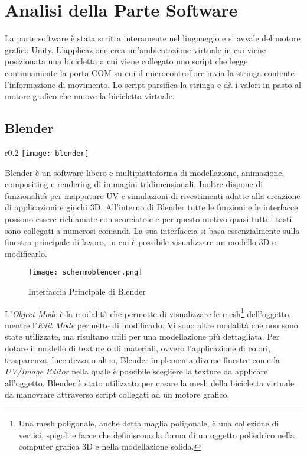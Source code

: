 \section{Analisi della Parte Software}
\label{software}
La parte software è stata scritta interamente nel linguaggio \Csharp\: e si avvale del motore grafico Unity. L'applicazione crea un'ambientazione virtuale in cui viene posizionata una bicicletta a cui viene collegato uno script che legge continuamente la porta COM su cui il microcontrollore invia la stringa contente l'informazione di movimento. Lo script parsifica la stringa e dà i valori in pasto al motore grafico che muove la bicicletta virtuale.
\subsection{Blender}
\begin{wrapfigure}{r}{0.2\textwidth} %
    \centering
    \vspace{-1.0cm}
    \texttt{[image: blender]}
\end{wrapfigure}
Blender è un software libero e multipiattaforma di modellazione, animazione, compositing e rendering di immagini tridimensionali. Inoltre dispone di funzionalità per mappature UV e simulazioni di rivestimenti adatte alla creazione di applicazioni e giochi 3D. All'interno di Blender tutte le funzioni e le interfacce possono essere richiamate con scorciatoie e per questo motivo quasi tutti i tasti sono collegati a numerosi comandi. La sua interfaccia si basa essenzialmente sulla finestra principale di lavoro, in cui è possibile visualizzare un modello 3D e modificarlo. 
\begin{figure}[hbt]
\centering
  \texttt{[image: schermoblender.png]}
  \caption{Interfaccia Principale di Blender}
\end{figure}

\noindent L'\textit{Object Mode} è la modalità che permette di visualizzare le mesh\footnote{Una mesh poligonale, anche detta maglia poligonale, è una collezione di vertici, spigoli e facce che definiscono la forma di un oggetto poliedrico nella computer grafica 3D e nella modellazione solida.} dell'oggetto, mentre l'\textit{Edit Mode} permette di modificarlo. Vi sono altre modalità che non sono state utilizzate, ma risultano utili per una modellazione più dettagliata. Per dotare il modello di texture o di materiali, ovvero l'applicazione di colori, trasparenza, lucentezza o altro, Blender implementa diverse finestre come la \textit{UV/Image Editor} nella quale è possibile scegliere la texture da applicare all'oggetto. Blender è stato utilizzato per creare la mesh della bicicletta virtuale da manovrare attraverso script collegati ad un motore grafico.
